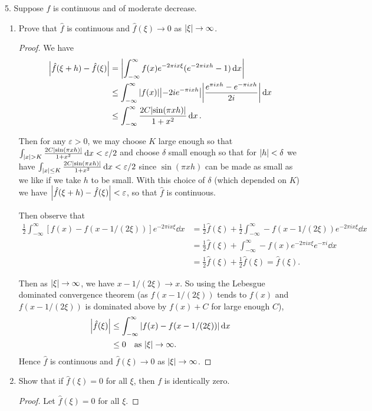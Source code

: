 \documentclass[11pt]{article}
\begin{document}
5. Suppose $f$ is continuous and of moderate decrease. 
\begin{enumerate}[label=(\alph*)]
  \item Prove that $\hat{f}$ is continuous and $\hat{f}(\xi) \to 0$ as $\abs{\xi}\to \infty$.
  \begin{proof}
    We have \begin{align*}
      \abs{\hat{f}(\xi+h) - \hat{f}(\xi)} &= \abs{\int_{-\infty}^{\infty} f(x)e^{-2\pi i x \xi}(e^{-2\pi i x h} - 1)\dd{x}}\\
      &\leq \int_{-\infty}^{\infty} \abs{f(x)}\abs{-2ie^{-\pi i x h}}\abs{\frac{e^{\pi i x h} - e^{-\pi i x h}}{2i}}\dd{x}\\
      &\leq \int_{-\infty}^{\infty} \frac{2C\abs{\sin(\pi x h)}}{1+x^2}\dd{x}.
    \end{align*}

    Then for any $\varepsilon >0$, we may choose $K$ large enough so that $\int_{\abs{x}> K}\frac{2C\abs{\sin(\pi x h)}}{1+x^2}\dd{x} < \varepsilon /2 $ and choose $\delta$ small enough so that for $\abs{h} < \delta$ we have $\int_{\abs{x} \leq K}\frac{2C\abs{\sin(\pi x h)}}{1+x^2}\dd{x} < \varepsilon /2 $ since $\sin(\pi x h)$ can be made as small as we like if we take $h$ to be small. With this choice of $\delta$ (which depended on $K$) we have $\abs{\hat{f}(\xi+h) - \hat{f}(\xi)} < \varepsilon$, so that $\hat{f}$ is continuous.

    Then observe that
    \begin{align*}
      \frac{1}{2}\int_{-\infty}^{\infty} [f(x)-f(x-1/(2\xi))]e^{-2\pi i x \xi}\dd{x} &= \frac{1}{2}\hat{f}(\xi) + \frac{1}{2} \int_{-\infty}^{\infty}-f(x-1/(2\xi))e^{-2\pi i x \xi}\dd{x}\\
      &= \frac{1}{2}\hat{f}(\xi) + \int_{-\infty}^{\infty} -f(x)e^{-2\pi i x \xi}e^{-\pi i}\dd{x} \\
      &= \frac{1}{2}\hat{f}(\xi) +\frac{1}{2}\hat{f}(\xi) = \hat{f}(\xi) .
    \end{align*}

    Then as $\abs{\xi}\to \infty$, we have $x-1/(2\xi) \to x$. So using the Lebesgue dominated convergence theorem (as $f(x-1/(2\xi))$ tends to $f(x)$ and $f(x-1/(2\xi))$ is dominated above by $f(x)+C$ for large enough $C$), \begin{align*}
      \abs{\hat{f}(\xi)} &\leq \int_{-\infty}^{\infty} \abs{f(x)-f(x-1/(2\xi))}\dd{x}\\
      &\leq 0 \quad \text{as } \abs{\xi}\to \infty.
    \end{align*}
    Hence $\hat{f}$ is continuous and $\hat{f}(\xi) \to 0$ as $\abs{\xi}\to \infty$.
  \end{proof}
  \item Show that if $\hat{f}(\xi) = 0$ for all $\xi$, then $f$ is identically zero.
  \begin{proof}
    Let $\hat{f}(\xi) = 0$ for all $\xi$. 
    

\end{proof}
\end{enumerate}
\end{document}
